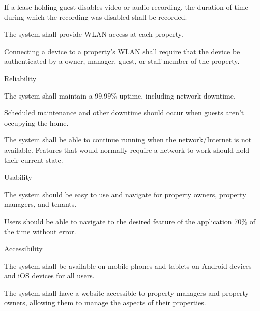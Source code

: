 \documentclass[letter,titlepage,oneside,english]{report}
\begin{document}
\begin{fr}
\begin{fr}
\begin{fr}
    \item
      If a lease-holding guest disables video or audio recording, the duration of time during which the recording was disabled shall be recorded.
    \end{fr}
  \end{fr}
\item
  The system shall provide WLAN access at each property.
  \begin{fr}
  \item
    Connecting a device to a property's WLAN shall require that the device be authenticated by a owner, manager, guest, or staff member of the property.
  \end{fr}
\end{fr}

\begin{nfr}
\item
	Reliability
	\begin{nfr}
	\item 
		The system shall maintain a 99.99\% uptime, including network downtime.
		\begin{nfr}
		\item 
			Scheduled maintenance and other downtime should occur when guests aren't occupying the home.
		\end{nfr}
	\item 
		The system shall be able to continue running when the network/Internet is not available. Features that would normally require a network to work should hold their current state.
	\end{nfr}
\item
	Usability
	\begin{nfr}
	\item 
		The system should be easy to use and navigate for property owners, property managers, and tenants.
			\begin{nfr}
			\item 
				Users should be able to navigate to the desired feature of the application 70\% of the time without error.
			\end{nfr}
	\end{nfr}
\item 
	Accessibility
		\begin{nfr}
		\item 
			The system shall be available on mobile phones and tablets on Android devices and iOS devices for all users.
		\item 
			The system shall have a website accessible to property managers and property owners, allowing them to manage the aspects of their properties.

\end{nfr}
\end{nfr}
\end{document}
